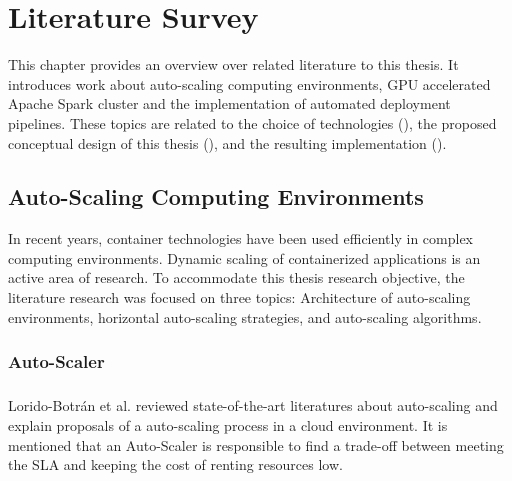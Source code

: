 \chapter{Literature Survey}
\label{chap:03_related-work}


This chapter provides an overview over related literature to this thesis. It introduces work about auto-scaling computing environments, GPU accelerated Apache Spark cluster and the implementation of automated deployment pipelines. These topics are related to the choice of technologies (), the proposed conceptual design of this thesis (), and the resulting implementation ().


\section{Auto-Scaling Computing Environments}
In recent years, container technologies have been used efficiently in complex computing environments. Dynamic scaling of containerized applications is an active area of research.
To accommodate this thesis research objective, the literature research was focused on three topics: Architecture of auto-scaling environments, horizontal auto-scaling strategies, and auto-scaling algorithms.


\subsection{Auto-Scaler}
\paragraph{}
Lorido-Botrán et al. \cite{Lorido2014Review} reviewed state-of-the-art literatures about auto-scaling and explain proposals of a auto-scaling process in a cloud environment.
It is mentioned that an Auto-Scaler is responsible to find a trade-off between meeting the SLA and keeping the cost of renting resources low.

